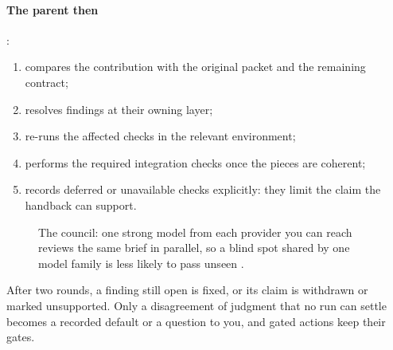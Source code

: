 \paragraph{The parent then} \cites[Review]{skill:delegation}[Numerical
  evidence]{skill:implementation}:
\begin{enumerate}
  \item compares the contribution with the original packet and the remaining contract;
  \item resolves findings at their owning layer;
  \item re-runs the affected checks in the relevant environment;
  \item performs the required integration checks once the pieces are coherent;
  \item records deferred or unavailable checks explicitly: they limit the claim the handback can
        support.
\end{enumerate}

\begin{figure}[H]
  \centering
  \caption{The council: one strong model from each provider you can reach reviews the same
    brief in parallel, so a blind spot shared by one model family is less likely to pass
    unseen \cite[Members; Rounds; Record]{skill:council}.}
  \label{fig:handoff-council}
\end{figure}

After two rounds, a finding still open is fixed, or its claim is withdrawn or marked
unsupported. Only a disagreement of judgment that no run can settle becomes a recorded
default or a question to you, and gated actions keep their gates.

